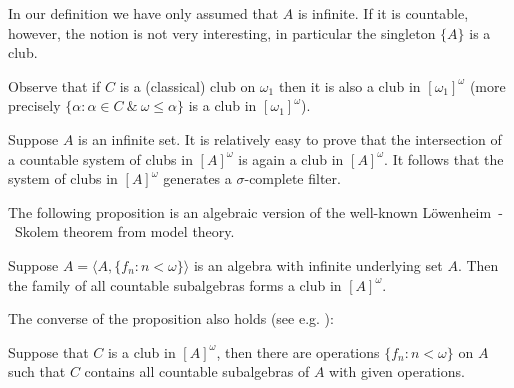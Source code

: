 \begin{note} In our definition we have only assumed that $A$ is infinite. If it is countable, however, the notion is not very interesting, in particular
the singleton $\{A\}$ is a club.
\end{note}

\begin{note} Observe that if $C$ is a (classical) club on $\omega_1$ then it is also a club in $[\omega_1]^{\omega}$
(more precisely $\{\alpha:\alpha\in C\ \&\ \omega\leq\alpha\}$ is a club in $[\omega_1]^{\omega}$).
\end{note}

\begin{fact}
Suppose $A$ is an infinite set. It is relatively easy to prove that the intersection
of a countable system of clubs in $[A]^{\omega}$ is again
a club in $[A]^{\omega}$. It follows that the system of clubs in $[A]^{\omega}$
generates a $\sigma$-complete filter.
\end{fact}
%

The following proposition is an algebraic version of the well-known L\"owenheim~-~Skolem theorem from model theory.

 \begin{proposition}\label{algebraic-club-A}
Suppose $A=\langle A,\{f_n:n<\omega\}\rangle$ is an algebra with infinite underlying set $A$.
Then the family of all  countable subalgebras forms a club in $[A]^{\omega}$.
 \end{proposition}

The converse of the proposition also holds (see e.g. \cite{JechST}):

 \begin{proposition}\label{algebraic-club-B}
Suppose that $C$ is a club in $[A]^{\omega}$, then there are operations
$\{f_n:n < \omega\}$ on $A$ such that
 $C$ contains all countable subalgebras of $A$ with given operations.
 \end{proposition}



